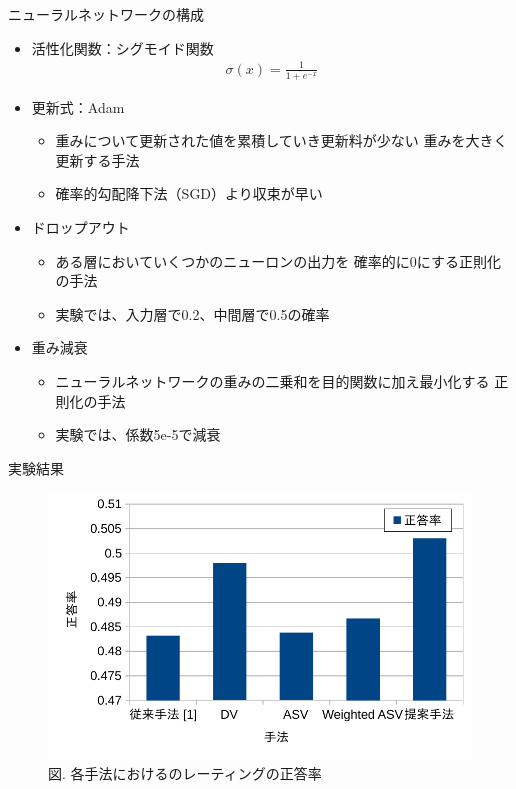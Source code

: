 \documentclass[unicode,10pt]{beamer}
\begin{document}
\begin{frame}{ニューラルネットワークの構成}{}
  \begin{itemize}
    \Large %
    \item 活性化関数：シグモイド関数
      \Large %
      \begin{gather*}
        \sigma(x) = \frac{1}{1 + e^{-x}}
      \end{gather*}
    \item 更新式：Adam
      \begin{itemize}
        \Large %
        \item 重みについて更新された値を累積していき更新料が少ない
              重みを大きく更新する手法
        \item 確率的勾配降下法（SGD）より収束が早い
      \end{itemize}
    \item ドロップアウト
      \begin{itemize}
        \Large %
        \item ある層においていくつかのニューロンの出力を
              確率的に0にする正則化の手法
        \item 実験では、入力層で0.2、中間層で0.5の確率
      \end{itemize}
    \item 重み減衰
      \begin{itemize}
        \Large %
        \item ニューラルネットワークの重みの二乗和を目的関数に加え最小化する
              正則化の手法
        \item 実験では、係数5e-5で減衰
      \end{itemize}
  \end{itemize}
\end{frame}

\begin{frame}{実験結果}{}
  \begin{figure}
    \centering
    \caption{\large %
             図. 各手法におけるのレーティングの正答率}
    \includegraphics[width=0.8\linewidth]{fig/graph_of_accuracies_of_methods.pdf}
  \end{figure}
\end{frame}
\end{document}
